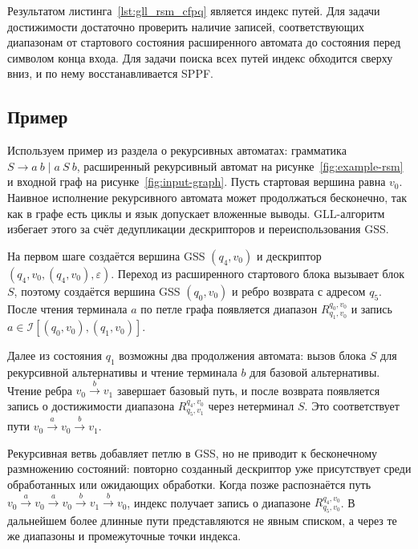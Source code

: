 Результатом листинга~\ref{lst:gll_rsm_cfpq} является индекс путей. Для задачи достижимости достаточно проверить наличие записей, соответствующих диапазонам от стартового состояния расширенного автомата до состояния перед символом конца входа. Для задачи поиска всех путей индекс обходится сверху вниз, и по нему восстанавливается SPPF.

\subsection{Пример}
\label{subsec:CFPQ_GLL_Example}

Используем пример из раздела о рекурсивных автоматах: грамматика $S \to a \ b \mid a \ S \ b$, расширенный рекурсивный автомат на рисунке~\ref{fig:example-rsm} и входной граф на рисунке~\ref{fig:input-graph}. Пусть стартовая вершина равна $v_0$. Наивное исполнение рекурсивного автомата может продолжаться бесконечно, так как в графе есть циклы и язык допускает вложенные выводы. GLL-алгоритм избегает этого за счёт дедупликации дескрипторов и переиспользования GSS.

На первом шаге создаётся вершина GSS $(q_4,v_0)$ и дескриптор $(q_4,v_0,(q_4,v_0),\varepsilon)$. Переход из расширенного стартового блока вызывает блок $S$, поэтому создаётся вершина GSS $(q_0,v_0)$ и ребро возврата с адресом $q_5$. После чтения терминала $a$ по петле графа появляется диапазон $R^{q_0,v_0}_{q_1,v_0}$ и запись $a \in \mathcal{I}[(q_0,v_0),(q_1,v_0)]$.

Далее из состояния $q_1$ возможны два продолжения автомата: вызов блока $S$ для рекурсивной альтернативы и чтение терминала $b$ для базовой альтернативы. Чтение ребра $v_0 \xrightarrow{b} v_1$ завершает базовый путь, и после возврата появляется запись о достижимости диапазона $R^{q_4,v_0}_{q_5,v_1}$ через нетерминал $S$. Это соответствует пути $v_0 \xrightarrow{a} v_0 \xrightarrow{b} v_1$.

Рекурсивная ветвь добавляет петлю в GSS, но не приводит к бесконечному размножению состояний: повторно созданный дескриптор уже присутствует среди обработанных или ожидающих обработки. Когда позже распознаётся путь $v_0 \xrightarrow{a} v_0 \xrightarrow{a} v_0 \xrightarrow{b} v_1 \xrightarrow{b} v_0$, индекс получает запись о диапазоне $R^{q_4,v_0}_{q_5,v_0}$. В дальнейшем более длинные пути представляются не явным списком, а через те же диапазоны и промежуточные точки индекса.

